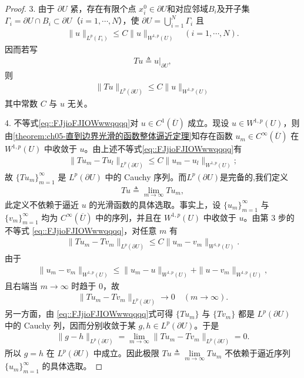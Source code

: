 \documentclass[../../main.tex]{subfiles}%
\begin{document}
\begin{proof}
3. 由于 $\partial U$ 紧，存在有限个点 $x_{i}^{0}\in\partial U$和对应邻域$B_i$及开子集 $\Gamma_{i}=\partial U\cap B_i\subset\partial U$（$i=1,\cdots,N$），使 $\partial U=\bigcup_{i=1}^{N}\Gamma_{i}$ 且
\begin{align*}
\|u\|_{L^{p}(\Gamma_{i})}\leqslant C\|u\|_{W^{1,p}(U)}\quad (i=1,\cdots,N).
\end{align*}
因而若写
\begin{align*}
Tu\triangleq u|_{\partial U},
\end{align*}
则
\begin{align}\label{eq::FJjioFJIOWwwqqqq}
\|Tu\|_{L^{p}(\partial U)}\leqslant C\|u\|_{W^{1,p}(U)}
\end{align}
其中常数 $C$ 与 $u$ 无关。

4. 不等式\eqref{eq::FJjioFJIOWwwqqqq}对 $u\in C^{1}(\overline{U})$ 成立。现设 $u\in W^{1,p}(U)$，则由\cref{theorem:ch05-直到边界光滑的函数整体逼近定理}知存在函数 $u_{m}\in C^{\infty}(\overline{U})$ 在 $W^{1,p}(U)$ 中收敛于 $u$。由上述不等式\eqref{eq::FJjioFJIOWwwqqqq}有
\begin{align}
\|Tu_{m}-Tu_{l}\|_{L^{p}(\partial U)}\leqslant C\|u_{m}-u_{l}\|_{W^{1,p}(U)};
\end{align}
故 $\{Tu_{m}\}_{m=1}^{\infty}$ 是 $L^{p}(\partial U)$ 中的 Cauchy 序列。而$L^{p}(\partial U)$是完备的,我们定义
\begin{align*}
Tu\triangleq\lim_{m\to\infty}Tu_{m},
\end{align*}
此定义不依赖于逼近 $u$ 的光滑函数的具体选取。事实上，设 \(\{u_m\}_{m=1}^\infty\) 与 \(\{v_m\}_{m=1}^\infty\) 均为 \(C^\infty(\overline U)\) 中的序列，并且在 \(W^{1,p}(U)\) 中收敛于 \(u\)。由第 3 步的不等式 \eqref{eq::FJjioFJIOWwwqqqq}，对任意 \(m\) 有
\begin{align*}
\|Tu_m-Tv_m\|_{L^p(\partial U)}
\leqslant C\|u_m-v_m\|_{W^{1,p}(U)}.
\end{align*}
由于
\begin{align*}
\|u_m-v_m\|_{W^{1,p}(U)}
\leqslant \|u_m-u\|_{W^{1,p}(U)}+\|u-v_m\|_{W^{1,p}(U)},
\end{align*}
且右端当 \(m\to\infty\) 时趋于 \(0\)，故
\begin{align*}
\|Tu_m-Tv_m\|_{L^p(\partial U)}\to 0\quad (m\to\infty).
\end{align*}
另一方面，由 \eqref{eq::FJjioFJIOWwwqqqq}式可得 \(\{Tu_m\}\) 与 \(\{Tv_m\}\) 都是 \(L^p(\partial U)\) 中的 Cauchy 列，因而分别收敛于某 \(g,h\in L^p(\partial U)\)。于是
\begin{align*}
\|g-h\|_{L^p(\partial U)}
=\lim\limits_{m\to\infty}\|Tu_m-Tv_m\|_{L^p(\partial U)}
=0.
\end{align*}
所以 \(g=h\) 在 \(L^p(\partial U)\) 中成立。因此极限 \(Tu\triangleq\lim\limits_{m\to\infty}Tu_m\) 不依赖于逼近序列 \(\{u_m\}_{m=1}^\infty\) 的具体选取。


\end{proof}
\end{document}
